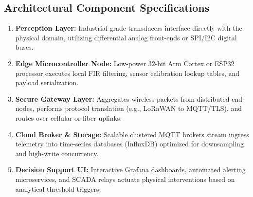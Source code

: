\subsection{Architectural Component Specifications}
\begin{enumerate}
  \item \textbf{Perception Layer:} Industrial-grade transducers interface directly with the physical domain, utilizing differential analog front-ends or SPI/I2C digital buses.
  \item \textbf{Edge Microcontroller Node:} Low-power 32-bit Arm Cortex or ESP32 processor executes local FIR filtering, sensor calibration lookup tables, and payload serialization.
  \item \textbf{Secure Gateway Layer:} Aggregates wireless packets from distributed end-nodes, performs protocol translation (e.g., LoRaWAN to MQTT/TLS), and routes over cellular or fiber uplinks.
  \item \textbf{Cloud Broker \& Storage:} Scalable clustered MQTT brokers stream ingress telemetry into time-series databases (InfluxDB) optimized for downsampling and high-write concurrency.
  \item \textbf{Decision Support UI:} Interactive Grafana dashboards, automated alerting microservices, and SCADA relays actuate physical interventions based on analytical threshold triggers.
\end{enumerate}
